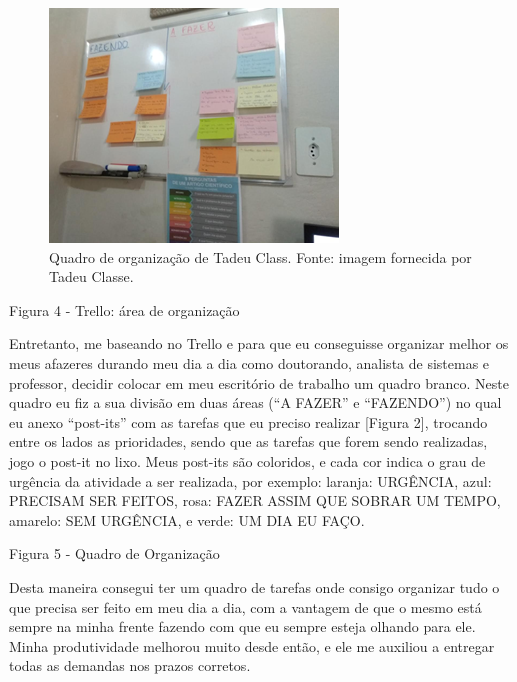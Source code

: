 
\begin{figure}[hbt]
	\centering
	\includegraphics[width=0.7\linewidth]{Images/quadroorganizacao}
	\caption{Quadro de organização de Tadeu Class. Fonte: imagem fornecida por Tadeu Classe.}
	\label{fig:quadroorganizacao}
\end{figure}



Figura 4 - Trello: área de organização


Entretanto, me baseando no Trello e para que eu conseguisse organizar melhor os meus afazeres durando meu dia a dia como doutorando, analista de sistemas e professor, decidir colocar em meu escritório de trabalho um quadro branco. Neste quadro eu fiz a sua divisão em duas áreas (“A FAZER” e “FAZENDO”) no qual eu anexo “post-its” com as tarefas que eu preciso realizar [Figura 2], trocando entre os lados as prioridades, sendo que as tarefas que forem sendo realizadas, jogo o post-it no lixo. Meus post-its são coloridos, e cada cor indica o grau de urgência da atividade a ser realizada, por exemplo: laranja: URGÊNCIA, azul: PRECISAM SER FEITOS, rosa: FAZER ASSIM QUE SOBRAR UM TEMPO, amarelo: SEM URGÊNCIA, e verde: UM DIA EU FAÇO.




Figura 5 - Quadro de Organização


Desta maneira consegui ter um quadro de tarefas onde consigo organizar tudo o que precisa ser feito em meu dia a dia, com a vantagem de que o mesmo está sempre na minha frente fazendo com que eu sempre esteja olhando para ele. Minha produtividade melhorou muito desde então, e ele me auxiliou a entregar todas as demandas nos prazos corretos.


